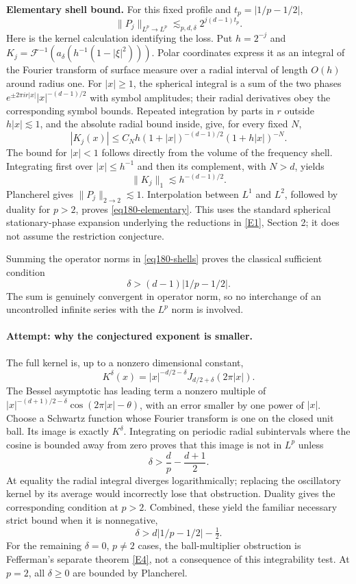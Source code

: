 \documentclass[11pt,a4paper]{article}
\newcommand{\eref}[2]{\hyperlink{extra:#1:#2}{[E#2]}}
\numberwithin{equation}{section}
\begin{document}
\textbf{Elementary shell bound.} For this fixed profile and
$t_p=|1/p-1/2|$,
\begin{equation}\label{eq180-elementary}
        \|P_j\|_{L^p\to L^p}\lesssim_{p,d,\delta}
                          2^{j(d-1)t_p}.
\end{equation}
Here is the kernel calculation identifying the loss. Put $h=2^{-j}$ and
$K_j=\mathcal F^{-1}(a_\delta(h^{-1}(1-|\xi|^2)))$. Polar coordinates
express it as an integral of the Fourier transform of surface measure
over a radial interval of length $O(h)$ around radius one. For $|x|\ge1$,
the spherical integral is a sum of the two phases
$e^{\pm2\pi i r|x|}|x|^{-(d-1)/2}$ with symbol amplitudes; their radial
derivatives obey the corresponding symbol bounds. Repeated integration
by parts in $r$ outside $h|x|\lesssim1$, and the absolute radial bound
inside, give, for every fixed $N$,
\[
 |K_j(x)|\le C_N h(1+|x|)^{-(d-1)/2}(1+h|x|)^{-N}.
\]
The bound for $|x|<1$ follows directly from the volume of the frequency
shell. Integrating first over $|x|\le h^{-1}$ and then its complement,
with $N>d$, yields
\[
        \|K_j\|_1\lesssim h^{-(d-1)/2}.
\]
Plancherel gives $\|P_j\|_{2\to2}\lesssim1$. Interpolation between
$L^1$ and $L^2$, followed by duality for $p>2$, proves
\eqref{eq180-elementary}. This uses the standard spherical
stationary-phase expansion underlying the reductions in
\eref{180}{1}, Section 2; it does not assume the restriction conjecture.

Summing the operator norms in \eqref{eq180-shells} proves the classical
sufficient condition
\begin{equation}\label{eq180-classical}
                     \delta>(d-1)|1/p-1/2|.
\end{equation}
The sum is genuinely convergent in operator norm, so no interchange of an
uncontrolled infinite series with the $L^p$ norm is involved.

\paragraph{Attempt: why the conjectured exponent is smaller.}
The full kernel is, up to a nonzero dimensional constant,
\[
 K^\delta(x)=|x|^{-d/2-\delta}
                         J_{d/2+\delta}(2\pi|x|).
\]
The Bessel asymptotic has leading term a nonzero multiple of
$|x|^{-(d+1)/2-\delta}\cos(2\pi|x|-\theta)$, with an error smaller by
one power of $|x|$. Choose a Schwartz function whose Fourier transform is
one on the closed unit ball. Its image is exactly $K^\delta$. Integrating
on periodic radial subintervals where the cosine is bounded away from
zero proves that this image is not in $L^p$ unless
\[
             \delta>\frac d p-\frac{d+1}{2}.
\]
At equality the radial integral diverges logarithmically; replacing the
oscillatory kernel by its average would incorrectly lose that obstruction.
Duality gives the corresponding condition at $p>2$. Combined, these yield
the familiar necessary strict bound when it is nonnegative,
\[
                 \delta>d|1/p-1/2|-\tfrac12.
\]
For the remaining $\delta=0$, $p\ne2$ cases, the ball-multiplier obstruction
is Fefferman's separate theorem \eref{180}{4}, not a consequence of this
integrability test. At $p=2$, all $\delta\ge0$ are bounded by Plancherel.
\end{document}

